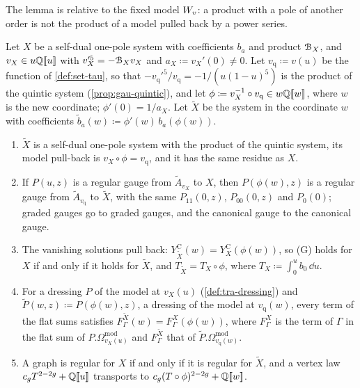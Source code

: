 The lemma is relative to the fixed model $W_{v}$: a product with a pole of another order is not the product of a model pulled back by a power series.

\begin{lem}
\label{lem:mai-coord}
Let $X$ be a self-dual one-pole system with coefficients $b_a$ and product $\mathcal{B}_X$, and $v_X\in u\mathbb{Q}[\![ u ]\!]$ with $v_X'^5=-\mathcal{B}_Xv_X$ and $a_X\coloneqq v_X'(0)\neq0$. Let $v_{\mathrm q}\coloneqq v(u)$ be the function of \cref{def:set-tau}, so that $-v_{\mathrm q}'^5/v_{\mathrm q}=-1/(u(1-u)^5)$ is the product of the quintic system (\cref{prop:gau-quintic}), and let $\phi\coloneqq v_X^{-1}\circ v_{\mathrm q}\in w\mathbb{Q}[\![ w ]\!]$, where $w$ is the new coordinate; $\phi'(0)=1/a_X$. Let $\tilde X$ be the system in the coordinate $w$ with coefficients $\tilde b_a(w)\coloneqq\phi'(w)\,b_a(\phi(w))$.
\begin{enumerate}
\item[(a)] $\tilde X$ is a self-dual one-pole system with the product of the quintic system, its model pull-back is $v_X\circ\phi=v_{\mathrm q}$, and it has the same residue as $X$.
\item[(b)] If $P(u,z)$ is a regular gauge from $\tilde A_{v_X}$ to $X$, then $P(\phi(w),z)$ is a regular gauge from $\tilde A_{v_{\mathrm q}}$ to $\tilde X$, with the same $P_{11}(0,z)$, $P_{00}(0,z)$ and $P_0(0)$; graded gauges go to graded gauges, and the canonical gauge to the canonical gauge.
\item[(c)] The vanishing solutions pull back: $Y^{\mathrm C}_{\tilde X}(w)=Y^{\mathrm C}_X(\phi(w))$, so (G) holds for $X$ if and only if it holds for $\tilde X$, and $T_{\tilde X}=T_X\circ\phi$, where $T_X\coloneqq\int_0^ub_0\,\dd u$.
\item[(d)] For a dressing $P$ of the model at $v_X(u)$ (\cref{def:tra-dressing}) and $\tilde P(w,z)\coloneqq P(\phi(w),z)$, a dressing of the model at $v_{\mathrm q}(w)$, every term of the flat sums satisfies $F^{\tilde X}_\Gamma(w)=F^X_\Gamma(\phi(w))$, where $F^X_\Gamma$ is the term of $\Gamma$ in the flat sum of $P.\Omega^{\mathrm{mod}}_{v_X(u)}$ and $F^{\tilde X}_\Gamma$ that of $\tilde P.\Omega^{\mathrm{mod}}_{v_{\mathrm q}(w)}$.
\item[(e)] A graph is regular for $X$ if and only if it is regular for $\tilde X$, and a vertex law $c_gT^{2-2g}+\mathbb{Q}[\![ u ]\!]$ transports to $c_g(T\circ\phi)^{2-2g}+\mathbb{Q}[\![ w ]\!]$.
\end{enumerate}
\end{lem}

